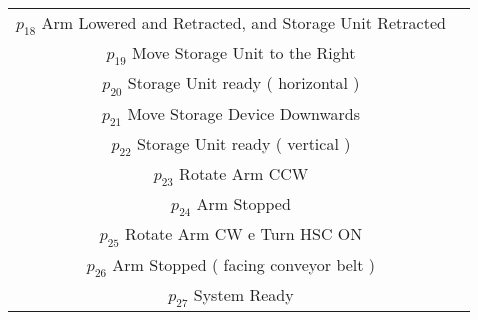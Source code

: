\begin{table}[htbp]
\begin{tabular}{cc}
\hyperlink{partialNet:p18}{\hypertarget{partialTable:p18}{$p_{18}$}} Arm Lowered and Retracted, and Storage Unit Retracted\\
\hyperlink{partialNet:p19}{\hypertarget{partialTable:p19}{$p_{19}$}} Move Storage Unit to the Right\\
\hyperlink{partialNet:p20}{\hypertarget{partialTable:p20}{$p_{20}$}} Storage Unit ready ( horizontal )\\
\hyperlink{partialNet:p21}{\hypertarget{partialTable:p21}{$p_{21}$}} Move Storage Device Downwards\\
\hyperlink{partialNet:p22}{\hypertarget{partialTable:p22}{$p_{22}$}} Storage Unit ready ( vertical )\\
\hyperlink{partialNet:p23}{\hypertarget{partialTable:p23}{$p_{23}$}} Rotate Arm CCW\\
\hyperlink{partialNet:p24}{\hypertarget{partialTable:p24}{$p_{24}$}} Arm Stopped\\
\hyperlink{partialNet:p25}{\hypertarget{partialTable:p25}{$p_{25}$}} Rotate Arm CW e Turn HSC ON\\
\hyperlink{partialNet:p26}{\hypertarget{partialTable:p26}{$p_{26}$}} Arm Stopped ( facing conveyor belt )\\
\hyperlink{partialNet:p27}{\hypertarget{partialTable:p27}{$p_{27}$}} System Ready\\
\end{tabular}
\end{table}

